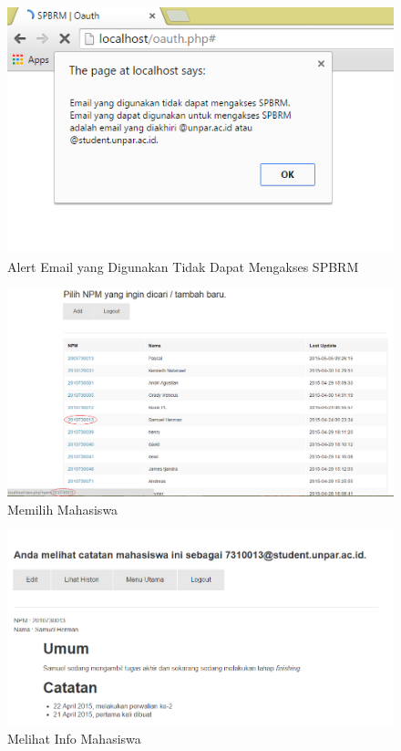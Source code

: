 \begin{figure}[H]
\centering
\includegraphics[scale=0.5]{Gambar/pengujian7.png}
\caption[Alert Email yang Digunakan Tidak Dapat Mengakses SPBRM]{Alert Email yang
Digunakan Tidak Dapat Mengakses SPBRM}
\label{fig:alert}
\end{figure}

\begin{figure}[H]
\centering
\includegraphics[scale=0.45]{Gambar/pengujian8.png}
\caption[Memilih Mahasiswa]{Memilih Mahasiswa} 
\label{fig:memilihmahasiswa}
\end{figure}

\begin{figure}[H]
\centering
\includegraphics[scale=0.5]{Gambar/pengujian9.png}
\caption[Melihat Info Mahasiswa]{Melihat Info Mahasiswa} 
\label{fig:melihatinfomahasiswa}
\end{figure}

